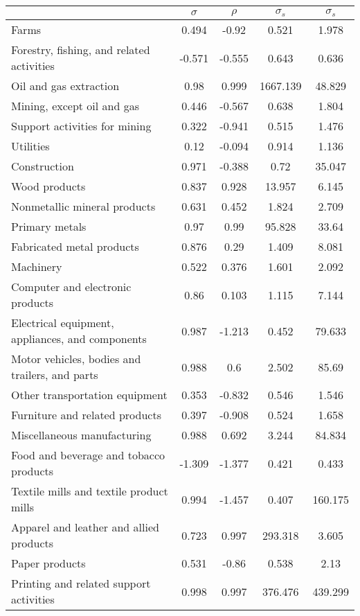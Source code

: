 \begin{table}[H]
\begin{center}
\begin{tabular}{lcccc}
\hline\hline
& $ \sigma$ & $\rho$ & $\sigma_s$ & $\sigma_s $ \\\hline
Farms & 0.494 & -0.92 & 0.521 & 1.978 \\
Forestry, fishing, and related activities & -0.571 & -0.555 & 0.643 & 0.636 \\
Oil and gas extraction & 0.98 & 0.999 & 1667.139 & 48.829 \\
Mining, except oil and gas & 0.446 & -0.567 & 0.638 & 1.804 \\
Support activities for mining & 0.322 & -0.941 & 0.515 & 1.476 \\
Utilities & 0.12 & -0.094 & 0.914 & 1.136 \\
Construction & 0.971 & -0.388 & 0.72 & 35.047 \\
Wood products & 0.837 & 0.928 & 13.957 & 6.145 \\
Nonmetallic mineral products & 0.631 & 0.452 & 1.824 & 2.709 \\
Primary metals & 0.97 & 0.99 & 95.828 & 33.64 \\
Fabricated metal products & 0.876 & 0.29 & 1.409 & 8.081 \\
Machinery & 0.522 & 0.376 & 1.601 & 2.092 \\
Computer and electronic products & 0.86 & 0.103 & 1.115 & 7.144 \\
Electrical equipment, appliances, and components & 0.987 & -1.213 & 0.452 & 79.633 \\
Motor vehicles, bodies and trailers, and parts & 0.988 & 0.6 & 2.502 & 85.69 \\
Other transportation equipment & 0.353 & -0.832 & 0.546 & 1.546 \\
Furniture and related products & 0.397 & -0.908 & 0.524 & 1.658 \\
Miscellaneous manufacturing & 0.988 & 0.692 & 3.244 & 84.834 \\
Food and beverage and tobacco products & -1.309 & -1.377 & 0.421 & 0.433 \\
Textile mills and textile product mills & 0.994 & -1.457 & 0.407 & 160.175 \\
Apparel and leather and allied products & 0.723 & 0.997 & 293.318 & 3.605 \\
Paper products & 0.531 & -0.86 & 0.538 & 2.13 \\
Printing and related support activities & 0.998 & 0.997 & 376.476 & 439.299 \\

\end{tabular}
\end{center}
\end{table}
